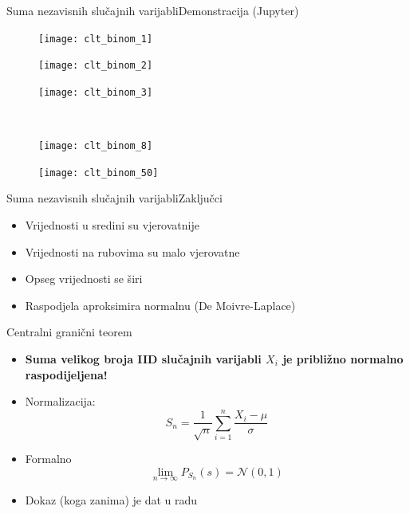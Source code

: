 \documentclass[aspectratio=169]{beamer}
\begin{document}
  \begin{frame}{Suma nezavisnih slučajnih varijabli}{Demonstracija (Jupyter)}
    \begin{figure}
      \begin{minipage}[b]{0.27\linewidth}
        \centering
        \texttt{[image: clt\_binom\_1]}
      \end{minipage}
      \begin{minipage}[b]{0.27\linewidth}
        \centering
        \texttt{[image: clt\_binom\_2]}
      \end{minipage}
      \begin{minipage}[b]{0.27\linewidth}
        \centering
        \texttt{[image: clt\_binom\_3]}
      \end{minipage}
      \\
      \begin{minipage}[b]{0.27\linewidth}
        \centering
        \texttt{[image: clt\_binom\_8]}
      \end{minipage}
      \begin{minipage}[b]{0.27\linewidth}
        \centering
        \texttt{[image: clt\_binom\_50]}
      \end{minipage}
    \end{figure}
  \end{frame}

  \begin{frame}{Suma nezavisnih slučajnih varijabli}{Zaključci}
    \begin{itemize}
      \item Vrijednosti u sredini su vjerovatnije
      \item Vrijednosti na rubovima su malo vjerovatne
      \item Opseg vrijednosti se širi
      \item Raspodjela aproksimira normalnu (De Moivre-Laplace)
    \end{itemize}
  \end{frame}
  
  \begin{frame}{Centralni granični teorem}
    \begin{itemize}
      \item \textbf{Suma velikog broja IID slučajnih varijabli $X_i$ je
        približno normalno raspodijeljena!}
      \item Normalizacija:
        $$S_n = \frac{1}{\sqrt{n}}\sum_{i=1}^{n} \frac{X_i-\mu}{\sigma}$$
      \item Formalno
        $$\lim_{n\to\infty} P_{S_n}(s) = \mathcal{N}(0,1)$$
      \item Dokaz (koga zanima) je dat u radu
    \end{itemize}
  \end{frame}
\end{document}
